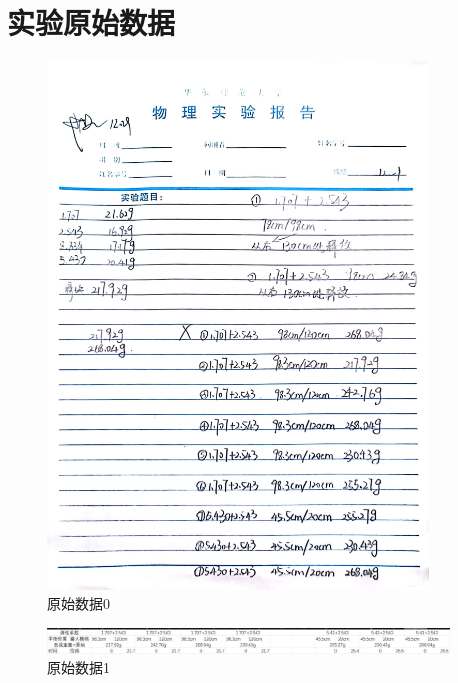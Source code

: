 \documentclass{ctexart}
\begin{document}
\section{实验原始数据}
\begin{figure}[H]
  \centering
  \includegraphics[width=0.9\textwidth,height=0.85\textheight]{shujvchuli0.jpg}
  \caption{原始数据0}
\end{figure}


\begin{figure}[H]
  \centering
  \includegraphics[width=0.95\textwidth,height=0.05\textheight]{shujvchuli1.png}
  \caption{原始数据1}
\end{figure}
\end{document}

